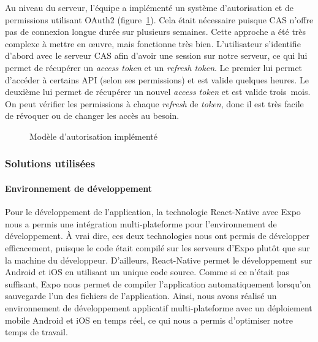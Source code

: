         Au niveau du serveur, l'équipe a implémenté un système d'autorisation et de permissions utilisant OAuth2 (figure~\ref{fig.modeleAutorisation}). Cela était nécessaire puisque CAS n'offre pas de connexion longue durée sur plusieurs semaines. Cette approche a été très complexe à mettre en \oe{}uvre, mais fonctionne très bien. L'utilisateur s'identifie d'abord avec le serveur CAS afin d'avoir une session sur notre serveur, ce qui lui permet de récupérer un \emph{access token} et un \emph{refresh token}. Le premier lui permet d'accéder à certains API (selon ses permissions) et est valide quelques heures. Le deuxième lui permet de récupérer un nouvel \emph{access token} et est valide trois~mois. On peut vérifier les permissions à chaque \emph{refresh} de \emph{token}, donc il est très facile de révoquer ou de changer les accès au besoin.
    
        \begin{figure}[hp] \centering
            
            \caption{Modèle d'autorisation implémenté}
            \label{fig.modeleAutorisation}
        \end{figure}  

        \subsubsection{Solutions utilisées}
        \paragraph{Environnement de développement}
        Pour le développement de l'application, la technologie React-Native avec Expo nous a permis une intégration multi-plateforme pour l'environnement de développement. À vrai dire, ces deux technologies nous ont permis de développer efficacement, puisque le code était compilé sur les serveurs d'Expo plutôt que sur la machine du développeur. D'ailleurs, React-Native permet le développement sur Android et iOS en utilisant un unique code source. Comme si ce n'était pas suffisant, Expo nous permet de compiler l'application automatiquement lorsqu'on sauvegarde l'un des fichiers de l'application. Ainsi, nous avons réalisé un environnement de développement applicatif multi-plateforme avec un déploiement mobile Android et iOS en temps réel, ce qui nous a permis d'optimiser notre temps de travail.
        

